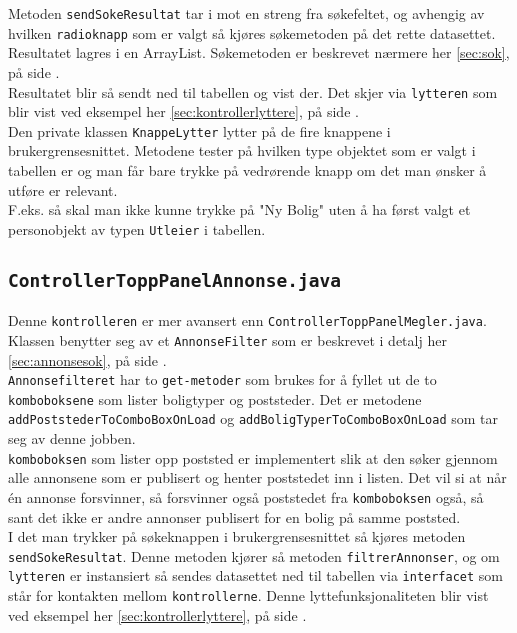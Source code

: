 Metoden \texttt{sendSokeResultat} tar i mot en streng fra søkefeltet, og avhengig av hvilken \texttt{radioknapp} som er valgt så kjøres søkemetoden på det rette datasettet. Resultatet lagres i en ArrayList. Søkemetoden er beskrevet nærmere her \ref{sec:sok}, på side \pageref{sec:sok}.\\
Resultatet blir så sendt ned til tabellen og vist der. Det skjer via \texttt{lytteren} som blir vist ved eksempel her \ref{sec:kontrollerlyttere}, på side \pageref{sec:kontrollerlyttere}. \\

Den private klassen \texttt{KnappeLytter} lytter på de fire knappene i brukergrensesnittet. Metodene tester på hvilken type objektet som er valgt i tabellen er og man får bare trykke på vedrørende knapp om det man ønsker å utføre er relevant.\\
F.eks. så skal man ikke kunne trykke på "Ny Bolig" uten å ha først valgt et personobjekt av typen \texttt{Utleier} i tabellen.

\subsection{\texttt{ControllerToppPanelAnnonse.java}}
Denne \texttt{kontrolleren} er mer avansert enn \texttt{ControllerToppPanelMegler.java}. Klassen benytter seg av et \texttt{AnnonseFilter} som er beskrevet i detalj her \ref{sec:annonsesok}, på side \pageref{sec:annonsesok}. \\
\texttt{Annonsefilteret} har to \texttt{get-metoder} som brukes for å fyllet ut de to \texttt{komboboksene} som lister boligtyper og poststeder. Det er metodene \texttt{addPoststederToComboBoxOnLoad} og \texttt{addBoligTyperToComboBoxOnLoad} som tar seg av denne jobben. \\
\texttt{komboboksen} som lister opp poststed er implementert slik at den søker gjennom alle annonsene som er publisert og henter poststedet inn i listen. Det vil si at når én annonse forsvinner, så forsvinner også poststedet fra \texttt{komboboksen} også, så sant det ikke er andre annonser publisert for en bolig på samme poststed. \\

I det man trykker på søkeknappen i brukergrensesnittet så kjøres metoden \texttt{sendSokeResultat}. Denne metoden kjører så metoden \texttt{filtrerAnnonser}, og om \texttt{lytteren} er instansiert så sendes datasettet ned til tabellen via \texttt{interfacet} som står for kontakten mellom \texttt{kontrollerne}. Denne lyttefunksjonaliteten blir vist ved eksempel her \ref{sec:kontrollerlyttere}, på side \pageref{sec:kontrollerlyttere}.

